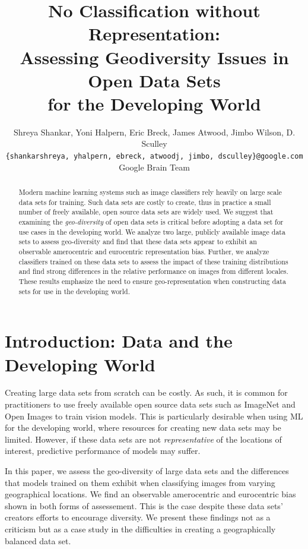 \documentclass{article}
\title{No Classification without Representation: \\
  Assessing Geodiversity Issues in Open Data Sets \\
  for the Developing World}
\author{
  Shreya Shankar, Yoni Halpern, Eric Breck, James Atwood, Jimbo Wilson, D. Sculley\\
  \texttt{\{shankarshreya, yhalpern, ebreck, atwoodj, jimbo, dsculley\}@google.com}\\
  Google Brain Team\\
}
\begin{document}
\maketitle

\begin{abstract}
  Modern machine learning systems such as image classifiers rely heavily on
  large scale data sets for training.  Such data sets are costly to create,
  thus in practice a small number of freely available, open source data sets
  are widely used. We suggest that examining the {\em geo-diversity}
  of open data sets is critical before adopting a data set for use
  cases in the developing world. We analyze two large, publicly available image
  data sets to assess geo-diversity and find that these data sets appear
  to exhibit an observable amerocentric and eurocentric representation bias.
  Further, we analyze classifiers trained on these data sets to assess the
  impact of these training distributions and find strong differences in the relative performance on images from
  different locales.  These results emphasize the need to ensure
  geo-representation when constructing data sets for use in the developing
  world.
  \end{abstract}

\section{Introduction: Data and the Developing World}


Creating large data sets from scratch can be costly. As such, it is common
for practitioners to use freely available open source data
sets such as ImageNet \cite{imagenet} and Open Images \cite{openimages}
to train vision models. This is particularly desirable when using ML for the
developing world, where resources for creating new data sets may be limited.
However, if these data sets are not {\em representative} of the locations of
interest, predictive performance of models may suffer.

In this paper, we assess the geo-diversity of large data sets and the
differences that models trained
on them exhibit when classifying images from varying
geographical locations. We find an observable amerocentric and
eurocentric bias shown in both forms of assessement.
This is the case despite these data sets' creators efforts to encourage diversity.
We present these findings not as a criticism
but as a case study in the difficulties in creating a geographically balanced
data set.
\end{document}
